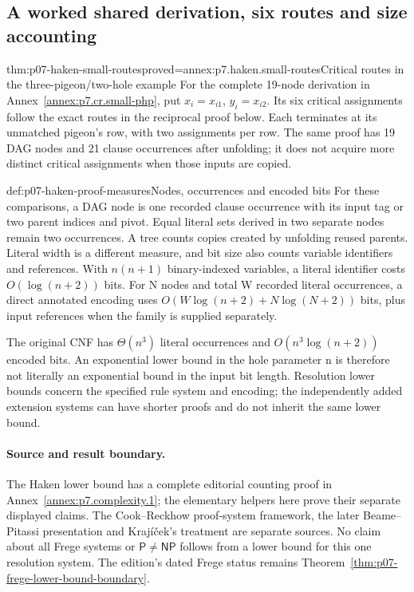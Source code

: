 \subsection{A worked shared derivation, six routes and size accounting}

\begin{hbtheorem}{thm:p07-haken-small-routes}{proved=annex:p7.haken.small-routes}{Critical routes in the three-pigeon/two-hole example}
For the complete 19-node derivation in
Annex~\ref{annex:p7.cr.small-php}, put
\(x_i=x_{i1}\), \(y_i=x_{i2}\). Its six critical assignments
follow the exact routes in the reciprocal proof below.
Each terminates at its unmatched pigeon's row, with two
assignments per row. The same proof has 19 DAG nodes and
21 clause occurrences after unfolding; it does not acquire
more distinct critical assignments when those inputs are copied.
\end{hbtheorem}

\begin{hbconvention}{def:p07-haken-proof-measures}{Nodes, occurrences and encoded bits}
For these comparisons, a DAG node is one recorded clause
occurrence with its input tag or two parent indices and pivot.
Equal literal sets derived in two separate nodes remain two
occurrences. A tree counts copies created by unfolding reused
parents. Literal width is a different measure, and bit size
also counts variable identifiers and references. With
\(n(n+1)\) binary-indexed variables, a literal identifier costs
\(O(\log(n+2))\) bits. For N nodes and total W recorded
literal occurrences, a direct annotated encoding uses
\(O(W\log(n+2)+N\log(N+2))\) bits, plus input references
when the family is supplied separately.

The original CNF has \(\Theta(n^3)\) literal occurrences
and \(O(n^3\log(n+2))\) encoded bits. An exponential
lower bound in the hole parameter n is therefore not literally
an exponential bound in the input bit length. Resolution
lower bounds concern the specified rule system and encoding;
the independently added extension systems can have shorter
proofs and do not inherit the same lower bound.
\end{hbconvention}

\paragraph{Source and result boundary.}
The Haken lower bound has a complete editorial counting proof in
Annex~\ref{annex:p7.complexity.1}; the elementary helpers here prove
their separate displayed claims. The Cook--Reckhow proof-system framework, the later
Beame--Pitassi presentation and Kraj\'i\v{c}ek's treatment are
separate sources. No claim about all Frege systems or
\(\mathsf P\ne\mathsf{NP}\) follows from a lower bound for
this one resolution system. The edition's dated Frege status
remains Theorem~\ref{thm:p07-frege-lower-bound-boundary}.
